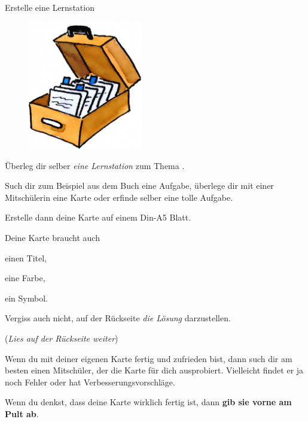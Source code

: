 \documentclass[12pt,a5paper,landscape]{scrartcl}
\begin{document}
	\begin{karte3}[\symPartner]{Erstelle eine Lernstation}
		\bigskip
			
		\begin{figure}
			\includegraphics[width=5cm]{6.2-LT-Abb_Kartei}
		\end{figure}
		Überleg dir selber \emph{eine Lernstation} zum Thema \emph{\Titel}.
		
		Such dir zum Beispiel aus dem Buch eine Aufgabe, überlege dir mit einer Mitschülerin eine Karte oder erfinde selber eine tolle Aufgabe.
		
		Erstelle dann deine Karte auf einem Din-A5 Blatt.
		
		Deine Karte braucht auch
		\begin{smallitemize}
			\item einen Titel,
			\item eine Farbe,
			\item ein Symbol.
		\end{smallitemize}
		
		Vergiss auch nicht, auf der Rückseite \emph{die Lösung} darzustellen.
		
		\bigskip
		(\textit{Lies auf der Rückseite weiter})

	\end{karte3}
	
	\begin{loesungskarte}
		Wenn du mit deiner eigenen Karte fertig und zufrieden bist, dann such dir am besten einen Mitschüler, der die Karte für dich ausprobiert. Vielleicht findet er ja noch Fehler oder hat Verbesserungsvorschläge.
		
		\bigskip
		Wenn du denkst, dass deine Karte wirklich fertig ist, dann \textbf{gib sie vorne am Pult ab}.
	\end{loesungskarte}
	
\end{document}
